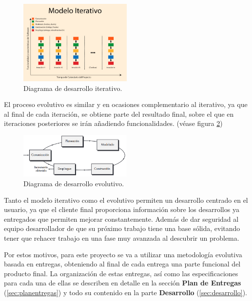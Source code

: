 \begin{figure}
	\centering
	\includegraphics[width=0.5\textwidth]{03.EstudioProblema/04.MetodologiaAUsar/00.Figuras/01.modelo_iterativo.jpg}
	\caption{Diagrama de desarrollo iterativo. \cite{MU_img_modeloiterativo}}
	\label{fig:MU_modeloiterativo}
\end{figure}


El proceso evolutivo es similar y en ocasiones complementario al iterativo, ya que al final de cada iteración, se obtiene parte del resultado final, sobre el que en iteraciones posteriores se irán añadiendo funcionalidades. (véase figura \ref{fig:MU_modeloevolutivo})


\begin{figure}
	\centering
	\includegraphics[width=0.5\textwidth]{03.EstudioProblema/04.MetodologiaAUsar/00.Figuras/02.modelo_evolutivo.png}
	\caption{Diagrama de desarrollo evolutivo. \cite{MU_img_modeloevolutivo}}
	\label{fig:MU_modeloevolutivo}
\end{figure}

 
Tanto el modelo iterativo como el evolutivo permiten un desarrollo centrado en el usuario, ya que el cliente final proporciona información sobre los desarrollos ya entregados que permiten mejorar constantemente. Además de dar seguridad al equipo desarrollador de que su próximo trabajo tiene una base sólida, evitando tener que rehacer trabajo en una fase muy avanzada al descubrir un problema.

Por estos motivos, para este proyecto se va a utilizar una metodología evolutiva basada en entregas, obteniendo al final de cada entrega una parte funcional del producto final. La organización de estas entregas, así como las especificaciones para cada una de ellas se describen en detalle en la sección \textbf{Plan de Entregas} (\ref{sec:planentregas}) y todo su contenido en la parte \textbf{Desarrollo} (\ref{sec:desarrollo}).


